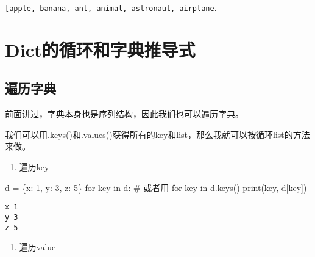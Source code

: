 \documentclass[
  letterpaper,
  DIV=11,
  numbers=noendperiod]{scrreprt}
\newenvironment{Shaded}{\begin{snugshade}}{\end{snugshade}}
\newcommand{\BuiltInTok}[1]{\textcolor[rgb]{0.00,0.23,0.31}{#1}}
\newcommand{\CommentTok}[1]{\textcolor[rgb]{0.37,0.37,0.37}{#1}}
\newcommand{\ControlFlowTok}[1]{\textcolor[rgb]{0.00,0.23,0.31}{#1}}
\newcommand{\DecValTok}[1]{\textcolor[rgb]{0.68,0.00,0.00}{#1}}
\newcommand{\KeywordTok}[1]{\textcolor[rgb]{0.00,0.23,0.31}{#1}}
\newcommand{\NormalTok}[1]{\textcolor[rgb]{0.00,0.23,0.31}{#1}}
\newcommand{\OperatorTok}[1]{\textcolor[rgb]{0.37,0.37,0.37}{#1}}
\newcommand{\StringTok}[1]{\textcolor[rgb]{0.13,0.47,0.30}{#1}}
\providecommand{\tightlist}{%
  \setlength{\itemsep}{0pt}\setlength{\parskip}{0pt}}\usepackage{longtable,booktabs,array}
\begin{document}
\texttt{{[}\textquotesingle{}apple\textquotesingle{},\ \textquotesingle{}banana\textquotesingle{},\ \textquotesingle{}ant\textquotesingle{},\ \textquotesingle{}animal\textquotesingle{},\ \textquotesingle{}astronaut\textquotesingle{},\ \textquotesingle{}airplane\textquotesingle{}{]}}.

\hypertarget{dictux7684ux5faaux73afux548cux5b57ux5178ux63a8ux5bfcux5f0f}{%
\section{Dict的循环和字典推导式}\label{dictux7684ux5faaux73afux548cux5b57ux5178ux63a8ux5bfcux5f0f}}

\hypertarget{ux904dux5386ux5b57ux5178}{%
\subsection{遍历字典}\label{ux904dux5386ux5b57ux5178}}

前面讲过，字典本身也是序列结构，因此我们也可以遍历字典。

我们可以用.keys()和.values()获得所有的key和list，那么我就可以按循环list的方法来做。

\begin{enumerate}
\def\labelenumi{\arabic{enumi}.}
\tightlist
\item
  遍历key
\end{enumerate}

\begin{Shaded}
\begin{Highlighting}[]
\NormalTok{d }\OperatorTok{=}\NormalTok{ \{}\StringTok{\textquotesingle{}x\textquotesingle{}}\NormalTok{: }\DecValTok{1}\NormalTok{, }\StringTok{\textquotesingle{}y\textquotesingle{}}\NormalTok{: }\DecValTok{3}\NormalTok{, }\StringTok{\textquotesingle{}z\textquotesingle{}}\NormalTok{: }\DecValTok{5}\NormalTok{\}}
\ControlFlowTok{for}\NormalTok{ key }\KeywordTok{in}\NormalTok{ d: }
\CommentTok{\# 或者用 for key in d.keys()}
    \BuiltInTok{print}\NormalTok{(key, d[key])}
\end{Highlighting}
\end{Shaded}

\begin{verbatim}
x 1
y 3
z 5
\end{verbatim}

\begin{enumerate}
\def\labelenumi{\arabic{enumi}.}
\setcounter{enumi}{1}
\tightlist
\item
  遍历value
\end{enumerate}
\end{document}
